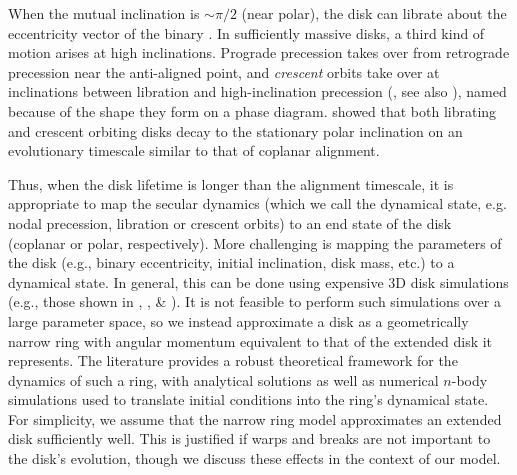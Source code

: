 \documentclass[twocolumn,linenumbers]{aastex631}
\begin{document}
When the mutual inclination is $\sim\pi/2$ (near polar), the disk can librate about the eccentricity vector of the binary \citep[e.g.,][]{verrier2009,farago2010,doolin2011}. In sufficiently massive disks, a third kind of motion arises at high inclinations. Prograde precession takes over from retrograde precession near the anti-aligned point, and {\it crescent} orbits take over at inclinations between libration and high-inclination precession (\citealt{chen2019}, see also \citealt{zanazzi2018}), named because of the shape they form on a phase diagram. \citet{abod2022} showed that both librating and crescent orbiting disks decay to the stationary polar inclination \citep[see][]{martin2019} on an evolutionary timescale similar to that of coplanar alignment.

Thus, when the disk lifetime is longer than the alignment timescale, it is appropriate to map the secular dynamics (which we call the dynamical state, e.g. nodal precession, libration or crescent orbits) to an end state of the disk (coplanar or polar, respectively). More challenging is mapping the parameters of the disk (e.g., binary eccentricity, initial inclination, disk mass, etc.) to a dynamical state. In general, this can be done using expensive 3D disk simulations (e.g., those shown in \citealt{martin2019}, \citealt{smallwood2019}, \& \citealt{abod2022}). It is not feasible to perform such simulations over a large parameter space, so we instead approximate a disk as a geometrically narrow ring with angular momentum equivalent to that of the extended disk it represents. The literature provides a robust theoretical framework for the dynamics of such a ring, with analytical solutions \citep{farago2010,zanazzi2018,martin2019} as well as numerical $n$-body simulations \citep{abod2022,lepp2022} used to translate initial conditions into the ring's dynamical state. For simplicity, we assume that the narrow ring model approximates an extended disk sufficiently well. This is justified if warps and breaks are not important to the disk's evolution, though we discuss these effects in the context of our model.
\end{document}
